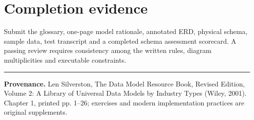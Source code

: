 \documentclass[11pt,letterpaper]{article}
\begin{document}
\section{Completion evidence}
Submit the glossary, one-page model rationale, annotated ERD, physical schema, sample data, test transcript and a completed schema assessment scorecard. A passing review requires consistency among the written rules, diagram multiplicities and executable constraints.


\vfill
\hrule
{\footnotesize\textbf{Provenance.} Len Silverston, The Data Model Resource Book, Revised Edition, Volume 2: A Library of Universal Data Models by Industry Types (Wiley, 2001). Chapter 1, printed pp. 1--26; exercises and modern implementation practices are original supplements.}
\end{document}
